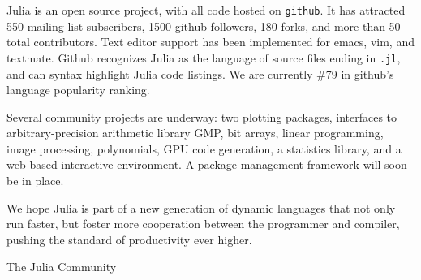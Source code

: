 \documentclass[9pt]{sigplanconf}
\begin{document}
Julia is an open source project, with all code hosted on {\tt github}.
It has attracted 550 mailing list subscribers, 1500 github followers,
180 forks, and more than 50 total contributors. Text editor support
has been implemented for emacs, vim, and textmate.
Github recognizes Julia as the language of source files ending in
{\tt .jl}, and can syntax highlight Julia code listings.
We are currently \#79 in github's language popularity ranking.

Several community projects are underway: two plotting packages,
interfaces to arbitrary-precision arithmetic library GMP,
bit arrays, linear programming, image processing, polynomials,
GPU code generation, a statistics library, and a web-based interactive
environment. A package management framework will soon be in place.

We hope Julia is part of a new generation of dynamic languages that not
only run faster, but foster more cooperation between the programmer
and compiler, pushing the standard of productivity ever higher.







\acks
The Julia Community




%
\end{document}
